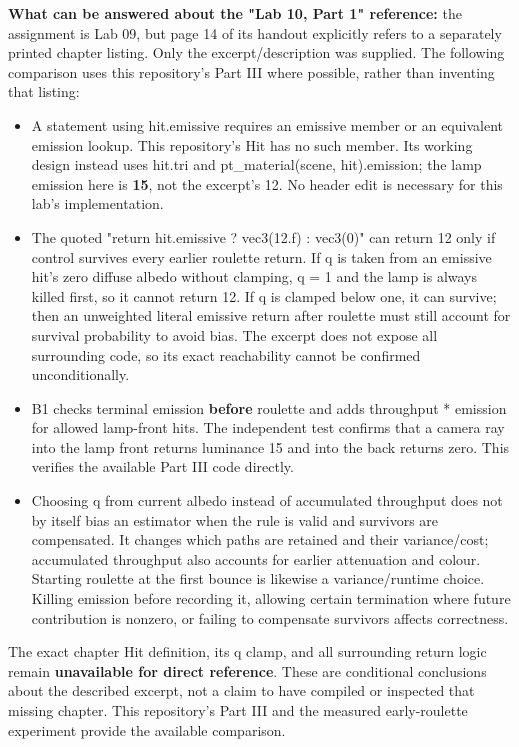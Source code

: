 \documentclass[11pt,a4paper]{article}
\begin{document}
\textbf{What can be answered about the "Lab 10, Part 1" reference:} the assignment is Lab 09, but page 14 of its handout explicitly refers to a separately printed chapter listing. Only the excerpt/\allowbreak{}description was supplied. The following comparison uses this repository's Part III where possible, rather than inventing that listing:


\begin{itemize}
\item A statement using hit.emissive requires an emissive member or an equivalent emission lookup. This repository's Hit has no such member. Its working design instead uses hit.tri and pt\_material(scene, hit).emission; the lamp emission here is \textbf{15}, not the excerpt's 12. No header edit is necessary for this lab's implementation.
\item The quoted "return hit.emissive ? vec3(12.f) : vec3(0)" can return 12 only if control survives every earlier roulette return. If q is taken from an emissive hit's zero diffuse albedo without clamping, q = 1 and the lamp is always killed first, so it cannot return 12. If q is clamped below one, it can survive; then an unweighted literal emissive return after roulette must still account for survival probability to avoid bias. The excerpt does not expose all surrounding code, so its exact reachability cannot be confirmed unconditionally.
\item B1 checks terminal emission \textbf{before} roulette and adds throughput * emission for allowed lamp-front hits. The independent test confirms that a camera ray into the lamp front returns luminance 15 and into the back returns zero. This verifies the available Part III code directly.
\item Choosing q from current albedo instead of accumulated throughput does not by itself bias an estimator when the rule is valid and survivors are compensated. It changes which paths are retained and their variance/\allowbreak{}cost; accumulated throughput also accounts for earlier attenuation and colour. Starting roulette at the first bounce is likewise a variance/\allowbreak{}runtime choice. Killing emission before recording it, allowing certain termination where future contribution is nonzero, or failing to compensate survivors affects correctness.
\end{itemize}
The exact chapter Hit definition, its q clamp, and all surrounding return logic remain \textbf{unavailable for direct reference}. These are conditional conclusions about the described excerpt, not a claim to have compiled or inspected that missing chapter. This repository's Part III and the measured early-roulette experiment provide the available comparison.
\end{document}
